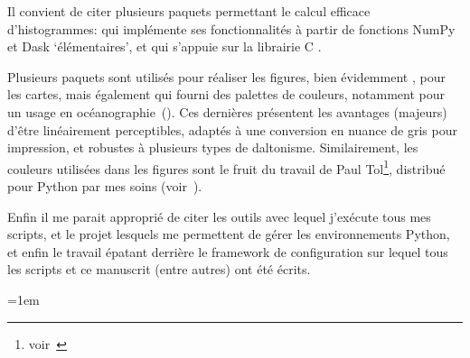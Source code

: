 Il convient de citer plusieurs paquets permettant le calcul efficace d'histogrammes:
 qui implémente ses fonctionnalités à partir de fonctions NumPy et Dask \enquote*{élémentaires}, et
 qui s'appuie sur la librairie C .

Plusieurs paquets sont utilisés pour réaliser les figures, bien évidemment ,
 pour les cartes,
mais également  qui fourni des palettes de couleurs, notamment pour un usage en océanographie~(\cite{thyng_2016}). Ces dernières présentent les avantages (majeurs) d'être linéairement perceptibles, adaptés à une conversion en nuance de gris pour impression, et robustes à plusieurs types de daltonisme.
Similairement, les couleurs utilisées dans les figures sont le fruit du travail de Paul Tol\footnote{voir~}, distribué pour Python par mes soins (voir~).

Enfin il me parait approprié de citer les outils  avec lequel j’exécute tous mes scripts,  et le projet  lesquels me permettent de gérer les environnements Python, et enfin le travail épatant derrière le framework de configuration  sur lequel tous les scripts et ce manuscrit (entre autres) ont été écrits.

{
  \emergencystretch=1em
  \printbibliography[heading=none, type=software, notkeyword=personnal]
}
